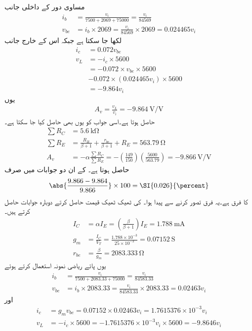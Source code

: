 مساوی دور کے داخلی جانب
\begin{align*}
i_b&=\frac{v_i}{7500+2069+75000}=\frac{v_i}{84569}\\
v_{be}&=i_b \times 2069=\frac{v_i}{84569} \times 2069=0.024465 v_i
\end{align*}
لکھا جا سکتا ہے جبکہ اس کے خارج جانب
\begin{align*}
i_c&=0.072 v_{be}\\
v_L&=-i_c \times 5600\\
&=-0.072 \times v_{be} \times 5600\\
&-0.072 \times \left(0.024465 v_i \right) \times 5600\\
&=-9.864 v_i
\end{align*}
 یوں
\begin{align*}
A_v=\frac{v_L}{v_i}=\SI{-9.864}{\volt \per \volt}
\end{align*}
حاصل ہوتا ہے۔اسی جواب کو یوں بھی حاصل کیا جا سکتا ہے۔
\begin{align*}
\sum R_C&=\SI{5.6}{\kilo \ohm}\\
\sum R_E&=\frac{R_B}{\beta+1}+\frac{r_{be}}{\beta+1}+R_E=\SI{563.79}{\ohm}\\
A_v&=-\alpha \frac{\sum R_C}{\sum R_E}=-\left(\frac{149}{150}\right)\left(\frac{5600}{563.79}\right)=\SI{-9.866}{\volt \per \volt}
\end{align*}
 حاصل ہوتا ہے۔ کے ان دو جوابات میں صرف
\begin{align*}
\abs{\frac{9.866-9.864}{9.866}} \times 100=\SI{0.026}{\percent}
\end{align*}
کا فرق ہے۔یہ فرق  تصور کرنے سے پیدا ہوا۔ کی ٹھیک ٹھیک قیمت حاصل کرتے دوبارہ جوابات حاصل کرتے ہیں۔
\begin{align*}
I_C &=\alpha I_E= \left(\frac{\beta}{\beta+1}\right) I_E=\SI{1.788}{\milli \ampere}\\
g_m&=\frac{I_C}{V_T}=\frac{1.788 \times 10^{-3}}{25 \times 10^{-3}}=\SI{0.07152}{\siemens}\\
r_{be}&=\frac{\beta}{g_m}=\SI{2083.333}{\ohm}
\end{align*}
یوں پائے ریاضی نمونہ  استعمال کرتے ہوئے
\begin{align*}
i_b&=\frac{v_i}{7500+2083.33+75000}=\frac{v_i}{84583.33}\\
v_{be}&=i_b \times 2083.33=\frac{v_i}{84583.33} \times 2083.33=0.02463 v_i
\end{align*}
اور
\begin{align*}
i_c&=g_m v_{be}=0.07152 \times 0.02463 v_i=1.7615376 \times 10^{-3} v_i\\
v_L&=-i_c \times 5600=- 1.7615376 \times 10^{-3} v_i \times 5600=-9.8646 v_i
\end{align*}
